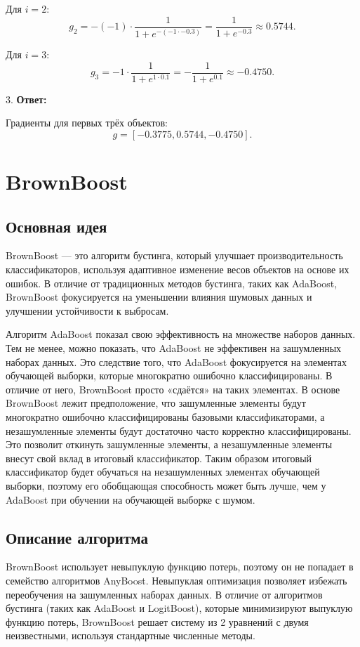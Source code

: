Для \(i = 2\):
\[
    g_2 = -(-1) \cdot \frac{1}{1 + e^{-(-1 \cdot -0.3)}} = \frac{1}{1 + e^{-0.3}} \approx 0.5744.
\]

Для \(i = 3\):
\[
    g_3 = -1 \cdot \frac{1}{1 + e^{1 \cdot 0.1}} = -\frac{1}{1 + e^{0.1}} \approx -0.4750.
\]

3. \textbf{Ответ:}

Градиенты для первых трёх объектов:
\[
    g = [-0.3775, 0.5744, -0.4750].
\]

\section{BrownBoost}

\subsection*{Основная идея}
BrownBoost — это алгоритм бустинга, который улучшает производительность классификаторов, используя адаптивное изменение весов объектов на основе их ошибок. В отличие от традиционных методов бустинга, таких как AdaBoost, BrownBoost фокусируется на уменьшении влияния шумовых данных и улучшении устойчивости к выбросам.

Алгоритм AdaBoost показал свою эффективность на множестве наборов данных. Тем не менее, можно показать, что AdaBoost не эффективен на зашумленных наборах данных. Это следствие того, что AdaBoost фокусируется на элементах обучающей выборки, которые многократно ошибочно классифицированы. В отличие от него, BrownBoost просто «сдаётся» на таких элементах. В основе BrownBoost лежит предположение, что зашумленные элементы будут многократно ошибочно классифицированы базовыми классификаторами, а незашумленные элементы будут достаточно часто корректно классифицированы. Это позволит откинуть зашумленные элементы, а незашумленные элементы внесут свой вклад в итоговый классификатор. Таким образом итоговый классификатор будет обучаться на незашумленных элементах обучающей выборки, поэтому его обобщающая способность может быть лучше, чем у AdaBoost при обучении на обучающей выборке с шумом.

\subsection*{Описание алгоритма}

BrownBoost использует невыпуклую функцию потерь, поэтому он не попадает в семейство алгоритмов AnyBoost. Невыпуклая оптимизация позволяет избежать переобучения на зашумленных наборах данных. В отличие от алгоритмов бустинга (таких как AdaBoost и LogitBoost), которые минимизируют выпуклую функцию потерь, BrownBoost решает систему из 2 уравнений с двумя неизвестными, используя стандартные численные методы.

